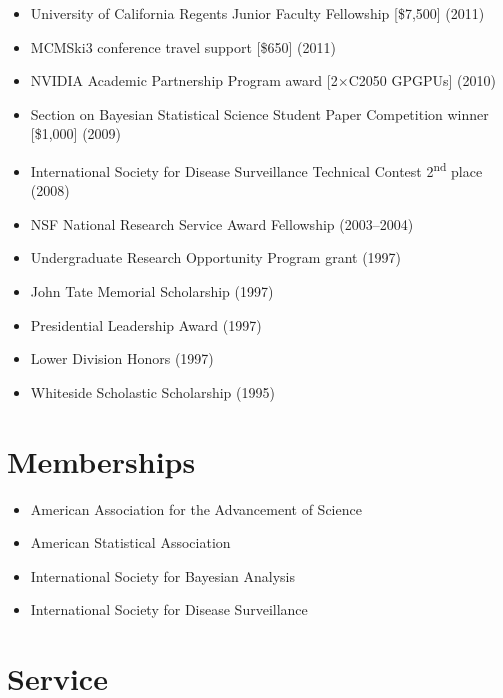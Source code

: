 \documentclass[overlapped,line]{res}
\begin{document}
\begin{resume}
\begin{itemize}
\item University of California Regents Junior Faculty Fellowship [\$7,500] (2011)
\item MCMSki3 conference travel support [\$650] (2011)
\item NVIDIA Academic Partnership Program award [2$\times$C2050 GPGPUs] (2010)
\item Section on Bayesian Statistical Science Student Paper Competition winner [\$1,000] (2009)
\item International Society for Disease Surveillance Technical Contest 2\textsuperscript{nd} place (2008)
\item NSF National Research Service Award Fellowship (2003--2004)
\item Undergraduate Research Opportunity Program grant (1997)
\item John Tate Memorial Scholarship (1997)
\item Presidential Leadership Award (1997)
\item Lower Division Honors (1997)
\item Whiteside Scholastic Scholarship (1995)
\end{itemize}


\section{\bf Memberships}
\begin{itemize}
\item American Association for the Advancement of Science
\item American Statistical Association
\item International Society for Bayesian Analysis
\item International Society for Disease Surveillance
\end{itemize}

\section{\bf Service}


\end{resume}
\end{document}

